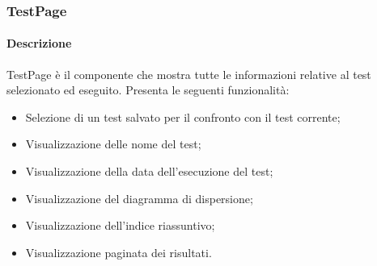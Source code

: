 \subsubsection{TestPage}
\label{sec:TestPage}
\paragraph{Descrizione}
TestPage è il componente che mostra tutte le informazioni relative al test selezionato ed eseguito. Presenta le seguenti funzionalità:
\begin{itemize}
    \item Selezione di un test salvato per il confronto con il test corrente; 
    \item Visualizzazione delle nome del test;
    \item Visualizzazione della data dell'esecuzione del test;
    \item Visualizzazione del diagramma di dispersione;
    \item Visualizzazione dell'indice riassuntivo;
    \item Visualizzazione paginata dei risultati.
\end{itemize}
